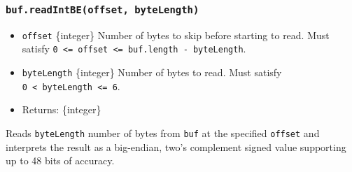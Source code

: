 \begin{Shaded}
\begin{Highlighting}[]
\NormalTok{ \{ }\NormalTok{ \} }\OperatorTok{=} \NormalTok{(}\NormalTok{)}\OperatorTok{;}

\OperatorTok{=} \NormalTok{([}\OperatorTok{,} \OperatorTok{,} \OperatorTok{,} \NormalTok{])}\OperatorTok{;}

\NormalTok{(}\NormalTok{))}\OperatorTok{;}
\NormalTok{(}\NormalTok{))}\OperatorTok{;}
\end{Highlighting}
\end{Shaded}

\subsubsection{\texorpdfstring{\texttt{buf.readIntBE(offset,\ byteLength)}}{buf.readIntBE(offset, byteLength)}}\label{buf.readintbeoffset-bytelength}

\begin{itemize}
\tightlist
\item
  \texttt{offset} \{integer\} Number of bytes to skip before starting to
  read. Must satisfy
  \texttt{0\ \textless{}=\ offset\ \textless{}=\ buf.length\ -\ byteLength}.
\item
  \texttt{byteLength} \{integer\} Number of bytes to read. Must satisfy
  \texttt{0\ \textless{}\ byteLength\ \textless{}=\ 6}.
\item
  Returns: \{integer\}
\end{itemize}

Reads \texttt{byteLength} number of bytes from \texttt{buf} at the
specified \texttt{offset} and interprets the result as a big-endian,
two's complement signed value supporting up to 48 bits of accuracy.

